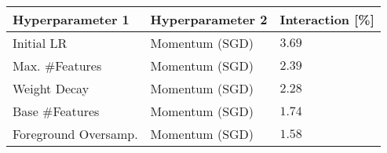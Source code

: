 \begin{tabular}{lll}
\toprule
Hyperparameter 1 & Hyperparameter 2 & Interaction [\%] \\
\midrule
Initial LR & Momentum (SGD) & $3.69$ \\
Max. #Features & Momentum (SGD) & $2.39$ \\
Weight Decay & Momentum (SGD) & $2.28$ \\
Base #Features & Momentum (SGD) & $1.74$ \\
Foreground Oversamp. & Momentum (SGD) & $1.58$ \\
\bottomrule
\end{tabular}
